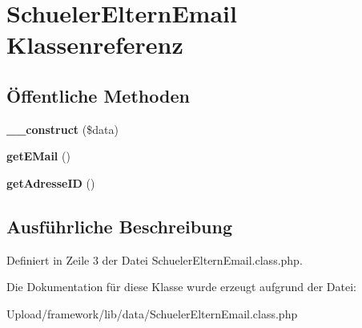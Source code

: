 \hypertarget{class_schueler_eltern_email}{}\section{Schueler\+Eltern\+Email Klassenreferenz}
\label{class_schueler_eltern_email}
\subsection*{Öffentliche Methoden}
\begin{DoxyCompactItemize}
\item 
\mbox{\label{class_schueler_eltern_email_ac8cfda4f241cc30e19644deb7f6e8269}} 
{\bfseries \+\_\+\+\_\+construct} (\$data)
\item 
\mbox{\label{class_schueler_eltern_email_af1bcdefed70d8c26055ff520e8cae81c}} 
{\bfseries get\+E\+Mail} ()
\item 
\mbox{\label{class_schueler_eltern_email_a0683cb22b0643da5268f94702207e6d0}} 
{\bfseries get\+Adresse\+ID} ()
\end{DoxyCompactItemize}


\subsection{Ausführliche Beschreibung}


Definiert in Zeile 3 der Datei Schueler\+Eltern\+Email.\+class.\+php.



Die Dokumentation für diese Klasse wurde erzeugt aufgrund der Datei\+:\begin{DoxyCompactItemize}
\item 
Upload/framework/lib/data/Schueler\+Eltern\+Email.\+class.\+php\end{DoxyCompactItemize}
